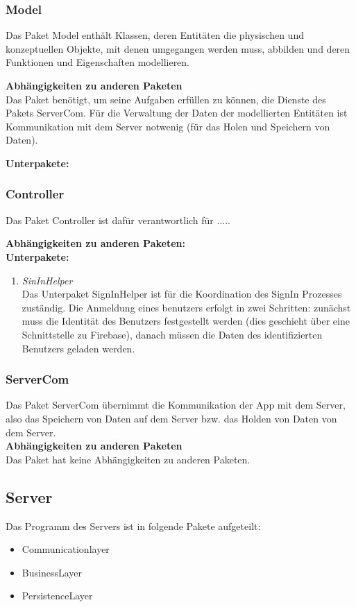 \documentclass[11pt,a4paper]{report}
\begin{document}
\subsubsection{Model}
Das Paket Model enthält Klassen, deren Entitäten die physischen und konzeptuellen Objekte, mit denen umgegangen werden muss, abbilden und deren Funktionen und Eigenschaften modellieren.

\textbf{Abhängigkeiten zu anderen Paketen}\\
Das Paket benötigt, um seine Aufgaben erfüllen zu können, die Dienste des Pakets ServerCom. Für die Verwaltung der Daten der modellierten Entitäten ist Kommunikation mit dem Server notwenig (für das Holen und Speichern von Daten).

\textbf{Unterpakete:}\\

\subsubsection{Controller}
Das Paket Controller ist dafür verantwortlich für .....

\textbf{Abhängigkeiten zu anderen Paketen:}\\


\textbf{Unterpakete:}\\
\begin{enumerate}
	\item \textit{SinInHelper}\\
	Das Unterpaket SignInHelper ist für die Koordination des SignIn Prozesses zuständig. Die Anmeldung eines benutzers erfolgt in zwei Schritten: zunächst muss die Identität des Benutzers festgestellt werden (dies geschieht über eine Schnittstelle zu Firebase), danach müssen die Daten des identifizierten Benutzers geladen werden.
\end{enumerate}

\subsubsection{ServerCom}
Das Paket ServerCom übernimmt die Kommunikation der App mit dem Server, also das Speichern von Daten auf dem Server bzw. das Holden von Daten von dem Server.\\

\textbf{Abhängigkeiten zu anderen Paketen}\\
Das Paket hat keine Abhängigkeiten zu anderen Paketen.

\subsection{Server}
Das Programm des Servers ist in folgende Pakete aufgeteilt:
\begin{itemize}
	\item Communicationlayer
	\item BusinessLayer
	\item PersistenceLayer
\end{itemize}
\end{document}

